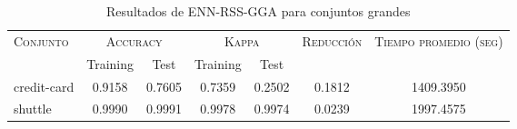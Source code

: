 \begin{table}[]
\centering
\begin{tabular}{l c c c c c c}
\hline
\multirow{2}{*}{\textsc{Conjunto}}
	& \multicolumn{2}{c}{\textsc{Accuracy}}
	& \multicolumn{2}{c}{\textsc{Kappa}}
	& \textsc{Reducción}
	& \textsc{Tiempo promedio (seg)} \\
	& Training & Test
	& Training & Test \\ 
\hline
\hline

credit-card & 0.9158 & 0.7605 & 0.7359 & 0.2502 & 0.1812 & 1409.3950  \\
shuttle & 0.9990 & 0.9991 & 0.9978 & 0.9974 & 0.0239 & 1997.4575 \\

\hline
\end{tabular}
\caption{Resultados de ENN-RSS-GGA para conjuntos grandes }
\label{res-grande-enn-rss-gga}
\end{table}

\clearpage


